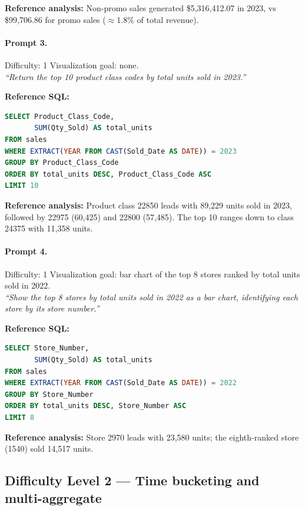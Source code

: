 \textbf{Reference analysis:}
Non-promo sales generated \$5,316,412.07 in 2023, vs \$99,706.86 for promo sales
($\approx$1.8\% of total revenue).

\bigskip

\paragraph{Prompt 3.}
Difficulty: 1 \quad Visualization goal: none.\\[2pt]
\textit{``Return the top 10 product class codes by total units sold in 2023.''}

\textbf{Reference SQL:}
\begin{lstlisting}[language=SQL]
SELECT Product_Class_Code,
       SUM(Qty_Sold) AS total_units
FROM sales
WHERE EXTRACT(YEAR FROM CAST(Sold_Date AS DATE)) = 2023
GROUP BY Product_Class_Code
ORDER BY total_units DESC, Product_Class_Code ASC
LIMIT 10
\end{lstlisting}

\textbf{Reference analysis:}
Product class 22850 leads with 89,229 units sold in 2023, followed by 22975
(60,425) and 22800 (57,485). The top 10 ranges down to class 24375 with 11,358 units.

\bigskip

\paragraph{Prompt 4.}
Difficulty: 1 \quad Visualization goal: bar chart of the top 8 stores ranked by total units sold in 2022.\\[2pt]
\textit{``Show the top 8 stores by total units sold in 2022 as a bar chart, identifying each store by its store number.''}

\textbf{Reference SQL:}
\begin{lstlisting}[language=SQL]
SELECT Store_Number,
       SUM(Qty_Sold) AS total_units
FROM sales
WHERE EXTRACT(YEAR FROM CAST(Sold_Date AS DATE)) = 2022
GROUP BY Store_Number
ORDER BY total_units DESC, Store_Number ASC
LIMIT 8
\end{lstlisting}

\textbf{Reference analysis:}
Store 2970 leads with 23,580 units; the eighth-ranked store (1540) sold 14,517 units.

\subsection*{Difficulty Level 2 — Time bucketing and multi-aggregate}


